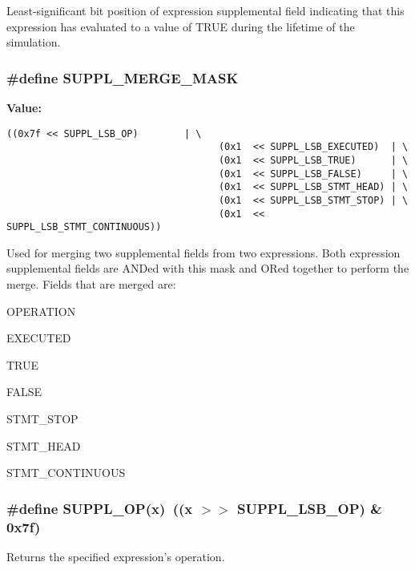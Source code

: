 Least-significant bit position of expression supplemental field indicating that this expression has evaluated to a value of TRUE during the lifetime of the simulation. 
\subsubsection{\setlength{\rightskip}{0pt plus 5cm}\#define SUPPL\_\-MERGE\_\-MASK}\label{group__expr__suppl_a11}


{\bf Value:}

\footnotesize\begin{verbatim}((0x7f << SUPPL_LSB_OP)        | \
                                     (0x1  << SUPPL_LSB_EXECUTED)  | \
                                     (0x1  << SUPPL_LSB_TRUE)      | \
                                     (0x1  << SUPPL_LSB_FALSE)     | \
                                     (0x1  << SUPPL_LSB_STMT_HEAD) | \
                                     (0x1  << SUPPL_LSB_STMT_STOP) | \
                                     (0x1  << SUPPL_LSB_STMT_CONTINUOUS))\end{verbatim}\normalsize 
Used for merging two supplemental fields from two expressions. Both expression supplemental fields are ANDed with this mask and ORed together to perform the merge. Fields that are merged are:\begin{CompactItemize}
\item 
OPERATION\item 
EXECUTED\item 
TRUE\item 
FALSE\item 
STMT\_\-STOP\item 
STMT\_\-HEAD\item 
STMT\_\-CONTINUOUS \end{CompactItemize}
\subsubsection{\setlength{\rightskip}{0pt plus 5cm}\#define SUPPL\_\-OP(x)\ ((x $>$$>$ SUPPL\_\-LSB\_\-OP) \& 0x7f)}\label{group__expr__suppl_a21}


Returns the specified expression's operation. 
